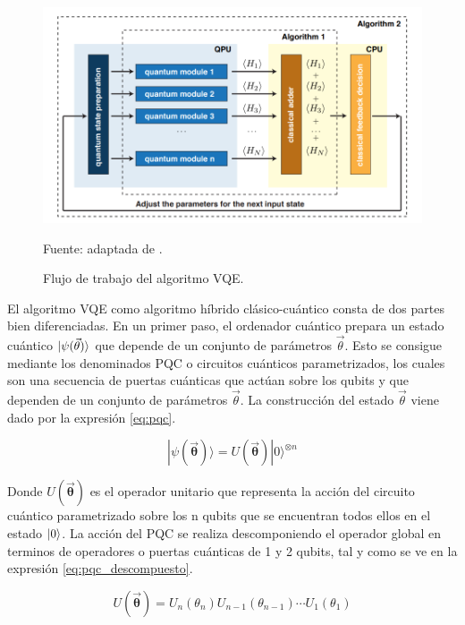 \begin{figure}[!ht]
    \centering
    \includegraphics[scale = 0.7]{img/03-vqe_workflow.png}
    \caption{Flujo de trabajo del algoritmo VQE.}
    Fuente: adaptada de \citep{peruzzo}.
    \label{fig:vqe}
\end{figure}


El algoritmo VQE como algoritmo híbrido clásico-cuántico consta de dos partes bien diferenciadas. En un primer paso, el ordenador cuántico prepara un estado cuántico $\ket{\psi(\Vec{\theta})}$ que depende de un conjunto de parámetros $\Vec{\theta}$. Esto se consigue mediante los denominados PQC o circuitos cuánticos parametrizados, los cuales son una secuencia de puertas cuánticas que actúan sobre los qubits y que dependen de un conjunto de parámetros $\Vec{\theta}$. La construcción del estado $\Vec{\theta}$ viene dado por la expresión \ref{eq:pqc}.

\begin{equation}
    |\psi(\boldsymbol{\Vec{\theta}}) \rangle = U(\boldsymbol{\Vec{\theta}}) |0\rangle^{\otimes n}
    \label{eq:pqc}
\end{equation}

Donde $U(\boldsymbol{\Vec{\theta}})$ es el operador unitario que representa la acción del circuito cuántico parametrizado sobre los n qubits que se encuentran todos ellos en el estado $\ket{0}$. La acción del PQC se realiza descomponiendo el operador global en terminos de operadores o puertas cuánticas de 1 y 2 qubits, tal y como se ve en la expresión \ref{eq:pqc_descompuesto}.

\begin{equation}
    U(\boldsymbol{\Vec{\theta}}) = U_n(\theta_n) U_{n-1}(\theta_{n-1}) \cdots U_1(\theta_1)
    \label{eq:pqc_descompuesto}
\end{equation}

